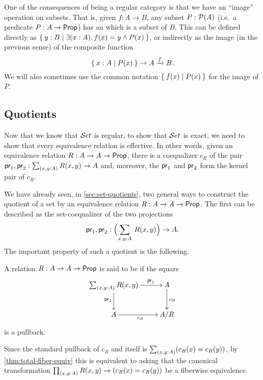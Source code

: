 One of the consequences of \uset being a regular category is that we have an ``image'' operation on subsets.
That is, given $f:A\to B$, any subset $P:\mathcal{P}(A)$ (i.e.\ a predicate $P:A\to \mathsf{Prop}$) has an  which is a subset of $B$.
This can be defined directly as $\setof{ y:B | \exis{x:A} f(x)=y \land P(x)}$, or indirectly as the image (in the previous sense) of the composite function
\[ \Set{ x:A | P(x) } \to A \xrightarrow{f} B .\]
We will also sometimes use the common notation $\Set{f(x) | P(x)}$ for the image of $P$.


\subsection{Quotients}\label{subsec:quotients}

%
Now that we know that $\mathcal{S}et$ is regular, to show that $\mathcal{S}et$ is exact, we need to show that every
equivalence relation is effective.
%
%
In other words, given an equivalence
relation $R:A\to A\to\mathsf{Prop}$, there is a coequalizer $c_R$ of the pair
$\proj1,\proj2:\sm{x,y:A} R(x,y)\to A$ and, moreover, the $\mathsf{pr}_{1}$ and $\mathsf{pr}_{2}$
form the kernel pair of $c_R$.

We have already seen, in \autoref{sec:set-quotients}, two general ways to construct the quotient of a set by an equivalence relation $R:A\to A\to\mathsf{Prop}$.
The first can be described as the set-coequalizer of the two projections
\[\proj1,\proj2:\Parens{\sm{x,y:A} R(x,y)} \to A.\]
The important property of such a quotient is the following.

\begin{defn}
  A relation $R:A\to A\to\mathsf{Prop}$ is said to be 
  if the square
\begin{equation*}
  \xymatrix{
    {\sm{x,y:A} R (x,y)}
    \ar[r]^(0.7){\proj1}
    \ar[d]_{\proj2}
    &
    {A}
    \ar[d]^{c_R}
    \\
    {A}
    \ar[r]_{c_R}
    &
    {A/R}
    }
\end{equation*}
is a pullback. 
\end{defn}

Since the standard pullback of $c_R$ and itself is $\sm{x,y:A} (c_R(x)=c_R(y))$, by \autoref{thm:total-fiber-equiv} this is equivalent to asking that the canonical transformation $\prd{x,y:A} R(x,y) \to (c_R(x)=c_R(y))$ be a fiberwise equivalence.

